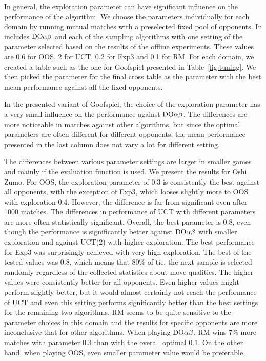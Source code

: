 In general, the exploration parameter can have significant influence on the performance of the algorithm. 
We choose the parameters individually for each domain by running mutual matches with a preselected fixed pool of opponents.
In includes $\textrm{DO}\alpha\beta$ and each of the sampling algorithms with one setting of the parameter selected based on the results of the offline experiments.
These values are 0.6 for OOS, 2 for UCT, 0.2 for Exp3 and 0.1 for RM.
For each domain, we created a table such as the one for Goofspiel presented in Table~\ref{fig:tuning}.
We then picked the parameter for the final cross table as the parameter with the best mean performance against all the fixed opponents.

In the presented variant of Goofspiel, the choice of the exploration parameter has a very small influence on the performance against $\textrm{DO}\alpha\beta$.
The differences are more noticeable in matches against other algorithms, but since the optimal parameters are often different for different opponents, the mean performance presented in the last column does not vary a lot for different setting.

The differences between various parameter settings are larger in smaller games and mainly if the evaluation function is used.
We present the results for Oshi Zumo.
For OOS, the exploration parameter of $0.3$ is consistently the best against all opponents, with the exception of Exp3, which looses slightly more to OOS with exploration 0.4.
However, the difference is far from significant even after 1000 matches.
The differences in performance of UCT with different parameters are more often statistically significant.
Overall, the best parameter is 0.8, even though the performance is significantly better against $\textrm{DO}\alpha\beta$ with smaller exploration and against UCT(2) with higher exploration.
The best performance for Exp3 was surprisingly achieved with very high exploration. The best of the tested values was 0.8, which means that 80\% of tie, the next sample is selected randomly regardless of the collected statistics about move qualities. 
The higher values were consistently better for all opponents. Even higher values might perform slightly better, but it would almost certainly not reach the performance of UCT and even this setting performs significantly better than the best settings for the remaining two algorithms.
RM seems to be quite sensitive to the parameter choices in this domain and the results for specific opponents are more inconclusive that for other algorithms.
When playing $\textrm{DO}\alpha\beta$, RM wins 7\% more  matches with parameter $0.3$ than with the overall optimal $0.1$.
On the other hand, when playing OOS, even smaller parameter value would be preferable.


